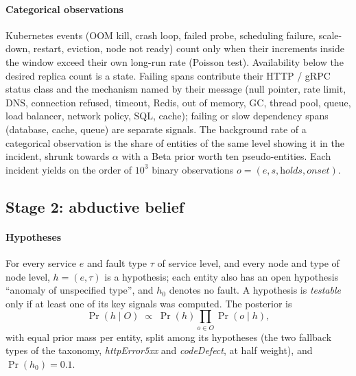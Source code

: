 \paragraph{Categorical observations}
Kubernetes events (OOM kill, crash loop, failed probe, scheduling failure, scale-down, restart, eviction, node not ready) count only
when their increments inside the window exceed their own long-run rate (Poisson test). Availability below the desired replica count
is a state. Failing spans contribute their HTTP / gRPC status class and the mechanism named by their message (null pointer, rate
limit, DNS, connection refused, timeout, Redis, out of memory, GC, thread pool, queue, load balancer, network policy, SQL, cache);
failing or slow dependency spans (database, cache, queue) are separate signals. The background rate of a categorical observation is
the share of entities of the same level showing it in the incident, shrunk towards $\alpha$ with a Beta prior worth ten
pseudo-entities. Each incident yields on the order of $10^3$ binary observations
$o=(e,s,\textit{holds},\textit{onset})$.

\subsection{Stage 2: abductive belief}\label{sec:belief}

\paragraph{Hypotheses}
For every service $e$ and fault type $\tau$ of service level, and every node and type of node level, $h=(e,\tau)$ is a hypothesis;
each entity also has an open hypothesis ``anomaly of unspecified type'', and $h_0$ denotes no fault. A hypothesis is \emph{testable}
only if at least one of its key signals was computed. The posterior is
\begin{equation}
\Pr(h\mid O)\;\propto\;\Pr(h)\prod_{o\in O}\Pr(o\mid h),
\end{equation}
with equal prior mass per entity, split among its hypotheses (the two fallback types of the taxonomy, \emph{httpError5xx} and
\emph{codeDefect}, at half weight), and $\Pr(h_0)=0.1$.

